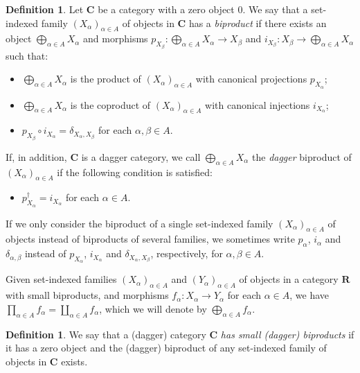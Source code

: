 \documentclass[12pt]{tac}
\theoremstyle{definition}
\newtheorem{definition}[theorem]{Definition}
\theoremstyle{remark}
\newcommand{\<}{\langle}
\renewcommand{\>}{\rangle}
\renewcommand{\:}{\colon}
\begin{document}
\begin{definition}\label{def:dagger biproducts}Let $\mathbf C$ be a category with a zero object $0$. We say that a set-indexed family $(X_\alpha)_{\alpha\in A}$ of objects in $\mathbf C$ has a \emph{biproduct} if there exists an object $\bigoplus_{\alpha\in A}X_\alpha$ and morphisms $p_{X_\beta}:\bigoplus_{\alpha\in A}X_\alpha\to X_\beta$ and $i_{X_\beta}:X_\beta\to \bigoplus_{\alpha\in A}X_\alpha$ such that:
\begin{itemize}
    \item $\bigoplus_{\alpha\in A}X_\alpha$ is the product of $(X_\alpha)_{\alpha\in A}$ with canonical projections $p_{X_\alpha}$;
    \item $\bigoplus_{\alpha\in A}X_\alpha$ is the coproduct of $(X_\alpha)_{\alpha\in A}$ with canonical injections $i_{X_\alpha}$;
    \item $p_{X_\beta}\circ i_{X_\alpha}=\delta_{X_\alpha,X_\beta}$ for each $\alpha,\beta\in A$.
\end{itemize}
If, in addition, $\mathbf C$ is a dagger category, we call $\bigoplus_{\alpha\in A}X_\alpha$ the \emph{dagger} biproduct of $(X_\alpha)_{\alpha\in A}$ if the following condition is satisfied:
\begin{itemize}
      \item $p_{X_\alpha}^\dag=i_{X_\alpha}$ for each $\alpha\in A$.
  \end{itemize}
If we only consider the biproduct of a single set-indexed family $(X_\alpha)_{\alpha\in A}$ of objects instead of biproducts of several families, we sometimes write $p_\alpha$, $i_\alpha$ and $\delta_{\alpha,\beta}$ instead of $p_{X_\alpha}$, $i_{X_\alpha}$ and $\delta_{X_\alpha,X_\beta}$, respectively, for $\alpha,\beta\in A$.

Given set-indexed families  $(X_\alpha)_{\alpha\in A}$ and $(Y_\alpha)_{\alpha\in A}$ of objects in a category $\mathbf R$ with small biproducts, and morphisms $f_\alpha:X_\alpha\to Y_\alpha$ for each $\alpha\in A$, we have $\prod_{\alpha\in A}f_\alpha=\coprod_{\alpha\in A}f_\alpha$, which we will denote by $\bigoplus_{\alpha\in A}f_\alpha$.
\end{definition}

\begin{definition}
We say that a (dagger) category $\mathbf C$ \emph{has small (dagger) biproducts} if it has a zero object and the (dagger) biproduct of any set-indexed family of objects in $\mathbf C$ exists. 
\end{definition}
\end{document}
